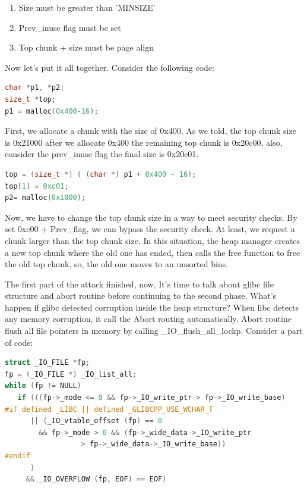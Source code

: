 \documentclass{masterthesis}
\newcommand*\libc{glibc}
\newcommand*\ub{unsorted bins}
\begin{document}
\begin{enumerate}
	\item Size must be greater than 'MINSIZE'
	\item Prev\_inuse flag must be set
	\item Top chunk + size must be page align
\end{enumerate}

Now let's put it all together. Consider the following code:

\begin{lstlisting}[language=c,frame=tlrb]
char *p1, *p2;
size_t *top;
p1 = malloc(0x400-16);
 \end{lstlisting}

First, we allocate a chunk with the size of 0x400, As we told, the top chunk size is 0x21000 after we allocate 0x400 the remaining top chunk is 0x20c00, also, consider the prev\_inuse flag the final size is 0x20c01.

\begin{lstlisting}[language=c,frame=tlrb]
top = (size_t *) ( (char *) p1 + 0x400 - 16);
top[1] = 0xc01;
p2= malloc(0x1000); 
\end{lstlisting}

Now, we have to change the top chunk size in a way to meet security checks. By set 0xc00 + Prev\_flag, we can bypass the security check. At least, we request a chunk larger than the top chunk size. In this situation, the heap manager creates a new top chunk where the old one has ended, then calls the free function to free the old top chunk, so, the old one moves to an \ub{}. 

The first part of the attack finished, now, It's time to talk about \libc{} file structure and abort routine before continuing to the second phase. What's happen if \libc{} detected corruption inside the heap structure? When libc detects any memory corruption, it call the Abort routing automatically. Abort routine flush all file pointers in memory by calling \_IO\_flush\_all\_lockp. Consider a part of code: 

\begin{lstlisting}[language=c,frame=tlrb]
struct _IO_FILE *fp;
fp = (_IO_FILE *) _IO_list_all;
while (fp != NULL)
   if (((fp->_mode <= 0 && fp->_IO_write_ptr > fp->_IO_write_base)
#if defined _LIBC || defined _GLIBCPP_USE_WCHAR_T
	  || (_IO_vtable_offset (fp) == 0
	    && fp->_mode > 0 && (fp->_wide_data->_IO_write_ptr
				  > fp->_wide_data->_IO_write_base))
#endif
	  )
	 && _IO_OVERFLOW (fp, EOF) == EOF)
\end{lstlisting}
\end{document}

